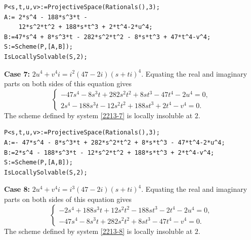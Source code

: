\documentclass[a4paper,12pt,english,reqno]{amsart}
\begin{document}

\begin{lstlisting}
P<s,t,u,v>:=ProjectiveSpace(Rationals(),3);
A:= 2*s^4 - 188*s^3*t -
    12*s^2*t^2 + 188*s*t^3 + 2*t^4-2*u^4;
B:=47*s^4 + 8*s^3*t - 282*s^2*t^2 - 8*s*t^3 + 47*t^4-v^4;
S:=Scheme(P,[A,B]);
IsLocallySolvable(S,2);
\end{lstlisting}

{\bf Case 7:} $2u^4+v^4i=i^2(47-2i)(s+ti)^4$. Equating the real and imaginary parts on both sides of this equation gives
\begin{equation}\label{2213-7}
\begin{cases}
-47s^4 - 8s^3t + 282s^2t^2 + 8st^3 - 47t^4 - 2u^4=0,\\
2s^4 - 188s^3t - 12s^2t^2 + 188st^3 + 2t^4 - v^4=0.
\end{cases}
\end{equation}
The scheme defined by system \eqref{2213-7} is locally insoluble at $2$.


\begin{lstlisting}
P<s,t,u,v>:=ProjectiveSpace(Rationals(),3);
A:=- 47*s^4 - 8*s^3*t + 282*s^2*t^2 + 8*s*t^3 - 47*t^4-2*u^4;
B:=2*s^4 - 188*s^3*t - 12*s^2*t^2 + 188*s*t^3 + 2*t^4-v^4;
S:=Scheme(P,[A,B]);
IsLocallySolvable(S,2);
\end{lstlisting}

{\bf Case 8:} $2u^4+v^4i=i^3(47-2i)(s+ti)^4$. Equating the real and imaginary parts on both sides of this equation gives
\begin{equation}\label{2213-8}
\begin{cases}
-2s^4 + 188s^3t + 12s^2t^2 - 188st^3 - 2t^4 - 2u^4=0,\\
-47s^4 - 8s^3t + 282s^2t^2 + 8st^3 - 47t^4 - v^4=0.
\end{cases}
\end{equation}
The scheme defined by system \eqref{2213-8} is locally insoluble at $2$.
\end{document}
